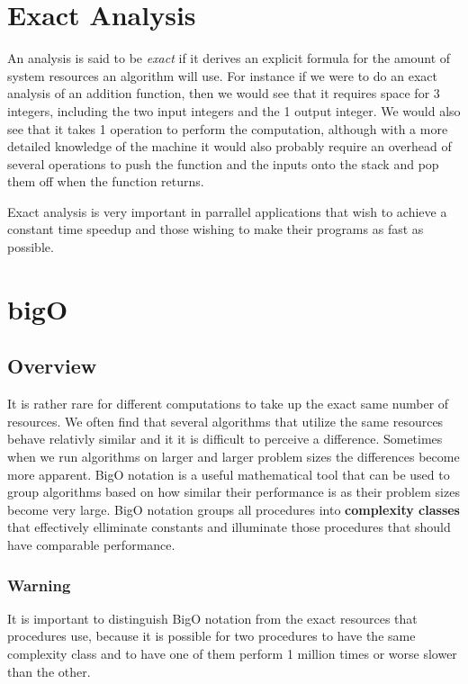 \documentclass[12pt, letterpaper]{book}
\begin{document}
		\section{Exact Analysis}

An analysis is said to be \textit{exact} if it derives an explicit formula for the amount of system resources an algorithm will use. For instance if we were to do an exact analysis of an addition function, then we would see that it requires space for 3 integers, including the two input integers and the 1 output integer. We would also see that it takes 1 operation to perform the computation, although with a more detailed knowledge of the machine it would also probably require an overhead of several operations to push the function and the inputs onto the stack and pop them off when the function returns.

Exact analysis is very important in parrallel applications that wish to achieve a constant time speedup and those wishing to make their programs as fast as possible.

\newpage

	\section{bigO} \label{bigO}
	\subsection{Overview}
	It is rather rare for different computations to take up the exact same number of resources. We often find that several algorithms that utilize the same resources behave relativly similar and it it is difficult to perceive a difference. Sometimes when we run algorithms on larger and larger problem sizes the differences become more apparent. BigO notation is a useful mathematical tool that can be used to group algorithms based on how similar their performance is as their problem sizes become very large. BigO notation groups all procedures into \textbf{complexity classes} that effectively elliminate constants and illuminate those procedures that should have comparable performance. 

\subsubsection{Warning}
It is important to distinguish BigO notation from the exact resources that procedures use, because it is possible for two procedures to have the same complexity class and to have one of them perform 1 million times or worse slower than the other.
\end{document}
